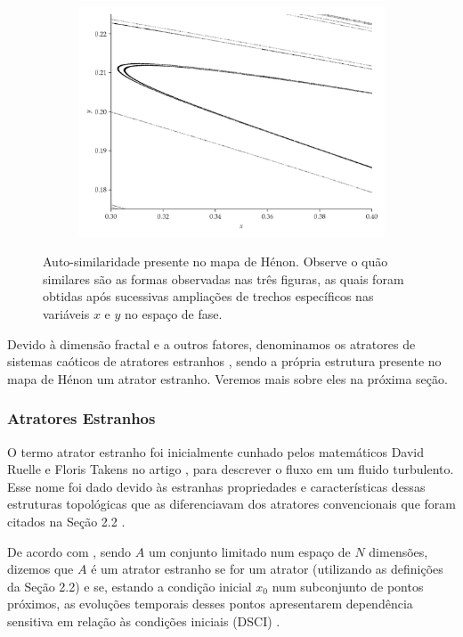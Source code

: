\documentclass[a4paper, 12pt]{article}
\begin{document}
\begin{figure}[!ht]
\begin{subfigure}[b]{0.45\textwidth}
	\end{subfigure}
	\\
	\begin{subfigure}[b]{0.45\textwidth}
		\includegraphics[scale=0.4]{mapa-de-henon-zoom-2.png}
	\end{subfigure}
	\caption{Auto-similaridade presente no mapa de Hénon. Observe o quão similares são as formas observadas nas três figuras, as quais foram obtidas após sucessivas ampliações de trechos específicos nas variáveis $x$ e $y$ no espaço de fase.}
	\label{fig:henon}
\end{figure}

Devido à dimensão fractal e a outros fatores, denominamos os atratores de sistemas caóticos de atratores estranhos \cite{ruelle1971nature}, sendo a própria estrutura presente no mapa de Hénon um atrator estranho. Veremos mais sobre eles na próxima seção.

\subsubsection{Atratores Estranhos}

O termo atrator estranho foi inicialmente cunhado pelos matemáticos David Ruelle e Floris Takens no artigo \cite{ruelle1971nature}, para descrever o fluxo em um fluido turbulento. Esse nome foi dado devido às estranhas propriedades e características dessas estruturas topológicas que as diferenciavam dos atratores convencionais que foram citados na Seção 2.2 \cite{gleick1998chaos}.

De acordo com \cite{attux2001dinamica}, sendo $A$ um conjunto limitado num espaço de $N$ dimensões, dizemos que $A$ é um atrator estranho se for um atrator (utilizando as definições da Seção 2.2) e se, estando a condição inicial $x_0$ num subconjunto de pontos próximos, as evoluções temporais desses pontos apresentarem dependência sensitiva em relação às condições iniciais (DSCI) \cite{fiedler1994caos}.
\end{document}

